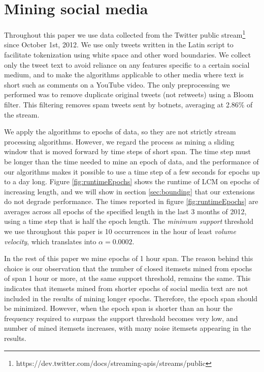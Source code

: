 \documentclass{sig-alternate}
\begin{document}
\section{Mining social media}
\label{sec:socmine}

Throughout this paper we use data collected from the Twitter public
stream\footnote{https://dev.twitter.com/docs/streaming-apis/streams/public}
since October 1st, 2012. 
We use only tweets written in the Latin script to facilitate tokenization
using white space and other word boundaries.
We collect only the tweet text to avoid reliance on any features specific to a
certain social medium,
and to make the algorithms applicable to other media where text is short  
such as comments on a YouTube video.
The only preprocessing we performed was to remove duplicate original tweets
(not retweets) using a Bloom filter.
This filtering removes spam tweets sent by botnets, averaging at 2.86\% of the stream. 

We apply the algorithms to epochs of data, so they are not strictly stream
processing algorithms.
However, we regard the process as mining a sliding window that is moved
forward by time steps of short span.
The time step must be longer than the time needed to mine an epoch of data,
and the performance of our algorithms makes it possible to use a time step
of a few seconds for epochs up to a day long.
Figure \ref{fig:runtimeEpochs} shows the runtime of LCM on epochs of
increasing length, and we will show in section \ref{sec:bounding} that our
extensions do not degrade performance.
The times reported in figure \ref{fig:runtimeEpochs} are averages across all
epochs of the specified length in the last 3 months of 2012, %
using a time step that is half the epoch length.
The \emph{minimum support} threshold we use throughout this paper
is 10 occurrences in the hour of least \emph{volume velocity},
which translates into $\alpha = 0.0002$.

In the rest of this paper we mine epochs of 1 hour span.
The reason behind this choice is our observation that the number of closed
itemsets mined from epochs of span 1 hour or more,
at the same support threshold, remains the same.
This indicates that itemsets mined from shorter epochs of social media text
are not included in the results of mining longer epochs. 
Therefore, the epoch span should be minimized.
However, when the epoch span is shorter than an hour the frequency required
to surpass the support threshold becomes very low,
and number of mined itemsets increases, with many noise itemsets appearing in
the results.
\end{document}
